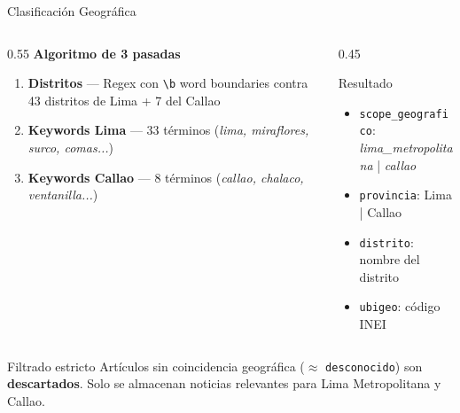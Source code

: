 \documentclass[11pt,aspectratio=169,spanish]{beamer}
\begin{document}
\begin{frame}{Clasificación Geográfica}
    \begin{columns}[T]
        \begin{column}{0.55\textwidth}
            \textbf{Algoritmo de 3 pasadas}
            \begin{enumerate}
                \item \textbf{Distritos} — Regex con \texttt{\textbackslash b} word boundaries contra 43 distritos de Lima + 7 del Callao
                \item \textbf{Keywords Lima} — 33 términos (\textit{lima, miraflores, surco, comas...})
                \item \textbf{Keywords Callao} — 8 términos (\textit{callao, chalaco, ventanilla...})
            \end{enumerate}
        \end{column}
        \begin{column}{0.45\textwidth}
            \begin{block}{Resultado}
                \begin{itemize}
                    \item \texttt{scope\_geografico}: \\
                      \textit{lima\_metropolitana} | \textit{callao}
                    \item \texttt{provincia}: Lima | Callao
                    \item \texttt{distrito}: nombre del distrito
                    \item \texttt{ubigeo}: código INEI
                \end{itemize}
            \end{block}
        \end{column}
    \end{columns}

    \begin{alertblock}{Filtrado estricto}
        Artículos sin coincidencia geográfica ($\approx$ \texttt{desconocido}) son \textbf{descartados}.
        Solo se almacenan noticias relevantes para Lima Metropolitana y Callao.
    \end{alertblock}
\end{frame}
\end{document}
